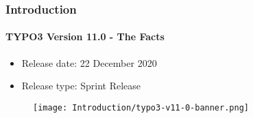 %

\begin{frame}[fragile]
	\frametitle{Introduction}
	\framesubtitle{TYPO3 Version 11.0 - The Facts}

	\begin{itemize}
		\item Release date: 22 December 2020
		\item Release type: Sprint Release
	\end{itemize}

	\begin{figure}
		\texttt{[image: Introduction/typo3-v11-0-banner.png]}
	\end{figure}

\end{frame}

